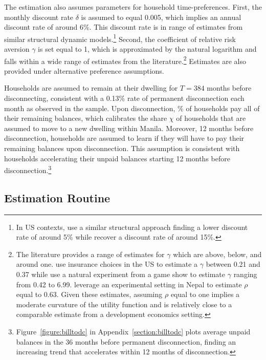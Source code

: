 \documentclass[12pt,table]{article}
\begin{document}
The estimation also assumes parameters for household time-preferences.  First, the monthly discount rate $\delta$ is assumed to equal 0.005, which implies an annual discount rate of around 6\%. This discount rate is in range of estimates from similar structural dynamic models.\footnote{In US contexts,\cite{gourinchas2002consumption} use a similar structural approach finding a lower discount rate of around 5\% while \cite{laibson2007estimating} recover a discount rate of around 15\%.}  Second, the coefficient of relative risk aversion $\gamma$ is set equal to 1, which is approximated by the natural logarithm and falls within a wide range of estimates from the literature.\footnote{The literature provides a range of estimates for $\gamma$ which are above, below, and around one.  \cite{barseghyan2013nature} use insurance choices in the US to estimate a $\gamma$ between 0.21 and 0.37 while  \cite{beetsma2001measuring} use a natural experiment from a game show to estimate $\gamma$ ranging from 0.42 to 6.99.  \cite{carvalho2016effect} leverage an experimental setting in Nepal to estimate $\rho$ equal to 0.63.  Given these estimates, assuming $\rho$ equal to one implies a moderate curvature of the utility function and is relatively close to a comparable estimate from a development economics setting.}  Estimates are also provided under alternative preference assumptions.

Households are assumed to remain at their dwelling for $T=384$ months before disconnecting, consistent with a 0.13\% rate of permanent disconnection each month as observed in the sample.  Upon disconnection, \unskip\% of households pay all of their remaining balances, which calibrates the share $\chi$ of households that are assumed to move to a new dwelling within Manila.  Moreover, 12 months before disconnection, households are assumed to learn if they will have to pay their remaining balances upon disconnection.  This assumption is consistent with households accelerating their unpaid balances starting 12 months before disconnection.\footnote{Figure~\ref{figure:billtodc} in Appendix~\ref{section:billtodc} plots average unpaid balances in the 36 months before permanent disconnection, finding an increasing trend that accelerates within 12 months of disconnection.}

\subsection{Estimation Routine}
\end{document}
